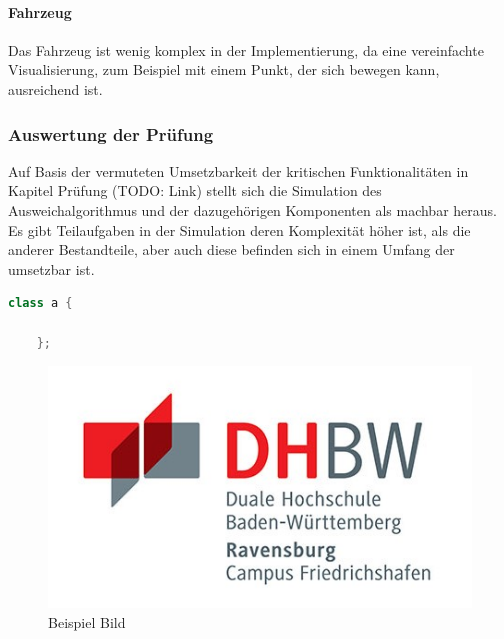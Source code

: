 \paragraph{Fahrzeug}
Das Fahrzeug ist wenig komplex in der Implementierung, da eine vereinfachte Visualisierung, zum Beispiel mit einem Punkt, der sich bewegen kann, ausreichend ist.

\subsubsection{Auswertung der Prüfung}
Auf Basis der vermuteten Umsetzbarkeit der kritischen Funktionalitäten in Kapitel Prüfung (TODO: Link) stellt sich die Simulation des Ausweichalgorithmus und der dazugehörigen Komponenten als machbar heraus. \\
Es gibt Teilaufgaben in der Simulation deren Komplexität höher ist, als die anderer Bestandteile, aber auch diese befinden sich in einem Umfang der umsetzbar ist.\\



\begin{lstlisting}[language=C++, caption=Beispiel Listing]
    class a {

    };
\end{lstlisting}

\begin{figure}[H]
    \centering
    \includegraphics[]{graphics/DHBW_logo.jpg}
    \caption{Beispiel Bild}
    \label{fig:bsp_bild}
\end{figure}

\newpage
